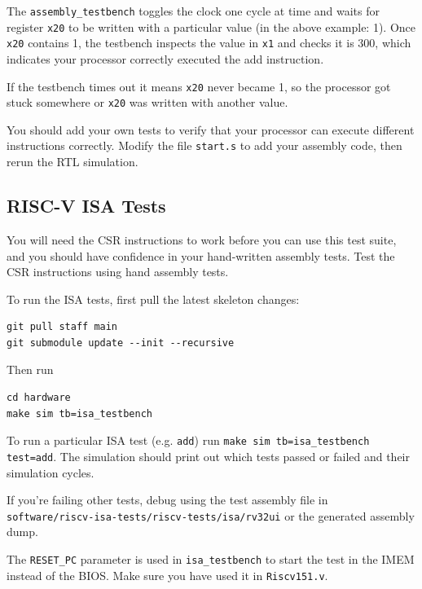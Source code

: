 \documentclass[11pt]{article}
\begin{document}
The \verb|assembly_testbench| toggles the clock one cycle at time and waits for register \verb|x20| to be written with a particular value (in the above example: 1).
Once \verb|x20| contains 1, the testbench inspects the value in \verb|x1| and checks it is 300, which indicates your processor correctly executed the add instruction.

If the testbench times out it means \verb|x20| never became 1, so the processor got stuck somewhere or \verb|x20| was written with another value.

You should add your own tests to verify that your processor can execute different instructions correctly. Modify the file \verb|start.s| to add your assembly code, then rerun the RTL simulation.

\subsection{RISC-V ISA Tests}\label{riscv-isa-tests}
You will need the CSR instructions to work before you can use this test suite, and you should have confidence in your hand-written assembly tests.
Test the CSR instructions using hand assembly tests.

To run the ISA tests, first pull the latest skeleton changes:
\begin{verbatim}
git pull staff main
git submodule update --init --recursive
\end{verbatim}

Then run

\begin{verbatim}
cd hardware
make sim tb=isa_testbench
\end{verbatim}

To run a particular ISA test (e.g. \verb|add|) run \verb|make sim tb=isa_testbench test=add|. The simulation should print out which tests passed or failed and their simulation cycles.


If you're failing other tests, debug using the test assembly file in\\\verb|software/riscv-isa-tests/riscv-tests/isa/rv32ui| or the generated assembly dump.

The \verb|RESET_PC| parameter is used in \verb|isa_testbench| to start the test in the IMEM instead of the BIOS.
Make sure you have used it in \verb|Riscv151.v|.
\end{document}
